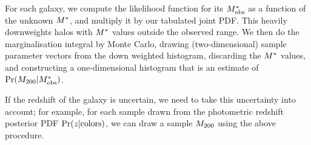 \documentclass[useAMS,usenatbib,a4paper]{mn2e}
\begin{document}
For each galaxy, we compute the likelihood function for its $M^{*}_{\rm obs}$ as a
function of the unknown $M^{*}$, and multiply it by our tabulated joint PDF.
This heavily downweights halos with $M^{*}$ values outside the observed
range. We then do the marginalisation integral by Monte Carlo, drawing
(two-dimensional) sample parameter vectors
from the down weighted histogram, discarding the $M^{*}$ values, and
constructing a one-dimensional histogram that is an estimate of
$\Pr(M_{200}|M^{*}_{\rm obs})$.

If the redshift of the galaxy is uncertain, we need to take this
uncertainty into account; for example, for each sample drawn from the
photometric redshift posterior PDF $\Pr(z|{\rm colors})$, we can draw a
sample $M_{200}$ using the above procedure.



% 

% 
% 




\label{lastpage}
\bsp
\end{document}
